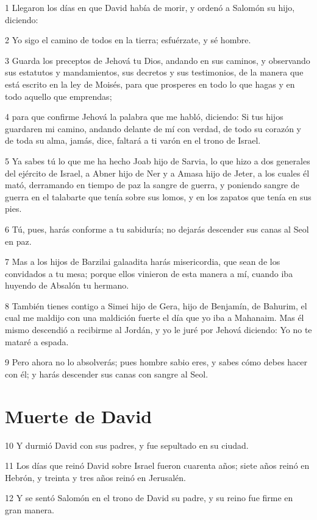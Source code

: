 \par 1 Llegaron los días en que David había de morir, y ordenó a Salomón su hijo, diciendo:
\par 2 Yo sigo el camino de todos en la tierra; esfuérzate, y sé hombre.
\par 3 Guarda los preceptos de Jehová tu Dios, andando en sus caminos, y observando sus estatutos y mandamientos, sus decretos y sus testimonios, de la manera que está escrito en la ley de Moisés, para que prosperes en todo lo que hagas y en todo aquello que emprendas;
\par 4 para que confirme Jehová la palabra que me habló, diciendo: Si tus hijos guardaren mi camino, andando delante de mí con verdad, de todo su corazón y de toda su alma, jamás, dice, faltará a ti varón en el trono de Israel.
\par 5 Ya sabes tú lo que me ha hecho Joab hijo de Sarvia, lo que hizo a dos generales del ejército de Israel, a Abner hijo de Ner y a Amasa hijo de Jeter, a los cuales él mató, derramando en tiempo de paz la sangre de guerra, y poniendo sangre de guerra en el talabarte que tenía sobre sus lomos, y en los zapatos que tenía en sus pies.
\par 6 Tú, pues, harás conforme a tu sabiduría; no dejarás descender sus canas al Seol en paz.
\par 7 Mas a los hijos de Barzilai galaadita harás misericordia, que sean de los convidados a tu mesa; porque ellos vinieron de esta manera a mí, cuando iba huyendo de Absalón tu hermano.
\par 8 También tienes contigo a Simei hijo de Gera, hijo de Benjamín, de Bahurim, el cual me maldijo con una maldición fuerte el día que yo iba a Mahanaim. Mas él mismo descendió a recibirme al Jordán, y yo le juré por Jehová diciendo: Yo no te mataré a espada. 
\par 9 Pero ahora no lo absolverás; pues hombre sabio eres, y sabes cómo debes hacer con él; y harás descender sus canas con sangre al Seol.

\section*{Muerte de David}

\par 10 Y durmió David con sus padres, y fue sepultado en su ciudad.
\par 11 Los días que reinó David sobre Israel fueron cuarenta años; siete años reinó en Hebrón, y treinta y tres años reinó en Jerusalén. 
\par 12 Y se sentó Salomón en el trono de David su padre, y su reino fue firme en gran manera.

